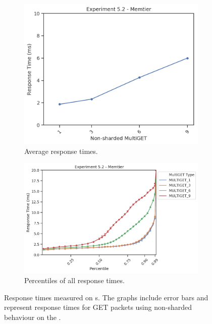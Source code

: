         \begin{figure}
            \vspace*{-.5\baselineskip}
                \centering
            \begin{subfigure}[t!]{0.43\textwidth}
                \centering
                \includegraphics[width=\textwidth]{../data_analysis/figures/5-2_mt_response-time.png}
                \caption{Average response times.\label{fig:noshard_mt_rt}}
            \end{subfigure}
            \begin{subfigure}[t!]{0.56\textwidth}
                \centering
                \includegraphics[width=\textwidth]{../data_analysis/figures/5-2_mt_percentiles.png}
                \caption{Percentiles of all response times.\label{fig:noshard_mt_rt_percentiles}}
            \end{subfigure}
            \caption{Response times measured on \cli{}s. The graphs include error bars and represent response times
                     for GET packets using non-sharded behaviour on the \mw.\label{fig:noshard_mt}}
        \end{figure}

